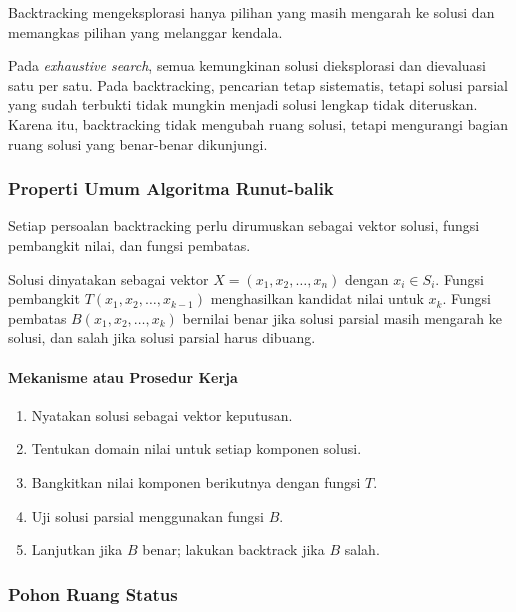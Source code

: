 \begin{jawab}
Backtracking mengeksplorasi hanya pilihan yang masih mengarah ke solusi dan memangkas pilihan yang melanggar kendala.
\end{jawab}

Pada \textit{exhaustive search}, semua kemungkinan solusi dieksplorasi dan dievaluasi satu per satu. Pada backtracking, pencarian tetap sistematis, tetapi solusi parsial yang sudah terbukti tidak mungkin menjadi solusi lengkap tidak diteruskan. Karena itu, backtracking tidak mengubah ruang solusi, tetapi mengurangi bagian ruang solusi yang benar-benar dikunjungi.

\subsubsection{Properti Umum Algoritma Runut-balik}

\begin{jawab}
Setiap persoalan backtracking perlu dirumuskan sebagai vektor solusi, fungsi pembangkit nilai, dan fungsi pembatas.
\end{jawab}

Solusi dinyatakan sebagai vektor $X=(x_1,x_2,\ldots,x_n)$ dengan $x_i \in S_i$. Fungsi pembangkit $T(x_1,x_2,\ldots,x_{k-1})$ menghasilkan kandidat nilai untuk $x_k$. Fungsi pembatas $B(x_1,x_2,\ldots,x_k)$ bernilai benar jika solusi parsial masih mengarah ke solusi, dan salah jika solusi parsial harus dibuang.

\paragraph{Mekanisme atau Prosedur Kerja}
\begin{enumerate}
    \item Nyatakan solusi sebagai vektor keputusan.
    \item Tentukan domain nilai untuk setiap komponen solusi.
    \item Bangkitkan nilai komponen berikutnya dengan fungsi $T$.
    \item Uji solusi parsial menggunakan fungsi $B$.
    \item Lanjutkan jika $B$ benar; lakukan backtrack jika $B$ salah.
\end{enumerate}

\subsubsection{Pohon Ruang Status}

